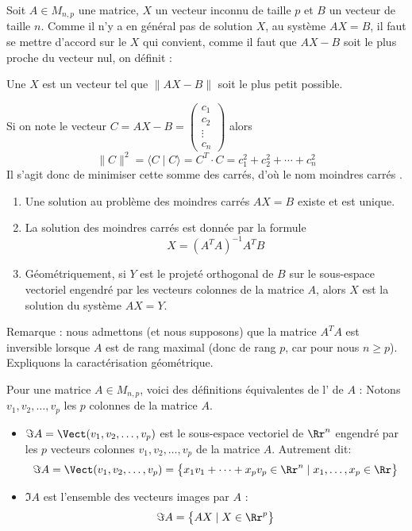 \documentclass[class=report,crop=false]{standalone}
\begin{document}
Soit $A \in M_{n,p}$ une matrice, $X$ un vecteur inconnu de taille $p$ et
$B$ un vecteur de taille $n$.
Comme il n'y a en général pas de solution $X$,
au système $AX=B$, il faut se mettre d'accord sur le $X$ qui 
convient, comme il faut que $AX-B$ soit le plus proche du vecteur nul,
on définit  :
\begin{definition}
Une  $X$ est un vecteur
tel que $\| AX -B \|$ soit le plus petit possible.
\end{definition}

Si on note le vecteur 
$C = AX-B = \left(\begin{smallmatrix}c_1\\c_2\\\vdots\\c_n\end{smallmatrix}\right)$ alors 
$$\| C \|^2 = \langle C \mid C \rangle = C^T \cdot C = c_1^2 + c_2^2+\cdots+c_n^2$$
Il s'agit donc de minimiser cette somme des carrés, d'où le nom \og moindres carrés \fg.

\begin{proposition}
\sauteligne
\begin{enumerate}
  \item Une solution au problème des moindres carrés $AX=B$ existe et est unique.
  \item La solution des moindres carrés est donnée par la formule 
  $$X = (A^TA)^{-1} A^T B$$ 
  \item Géométriquement, si $Y$ est le projeté orthogonal de $B$
  sur le sous-espace vectoriel engendré par les vecteurs colonnes de la matrice 
  $A$, alors $X$ est la solution du système $AX=Y$.
\end{enumerate} 
\end{proposition}


Remarque : nous admettons (et nous supposons) que la matrice $A^TA$ est inversible 
lorsque $A$ est de rang maximal (donc de rang $p$, car pour nous $n \ge p$).
Expliquons la caractérisation géométrique.


Pour une matrice $A \in M_{n,p}$, voici des définitions équivalentes de l' de $A$ :
Notons $v_1,v_2,\ldots,v_p$ les $p$ colonnes de la matrice $A$.

\begin{itemize}
  \item $\Im A = \Vect(v_1,v_2,\ldots,v_p)$ est le sous-espace vectoriel de $\Rr^n$ engendré par 
  les $p$ vecteurs colonnes $v_1,v_2,\ldots,v_p$ de la matrice $A$. Autrement dit:
  $$\Im A = \Vect(v_1,v_2,\ldots,v_p) = \big\lbrace x_1v_1+\cdots +x_pv_p \in\Rr^n\mid x_1,\ldots,x_p \in \Rr\big\rbrace$$
  
  \item $\Im A$ est l'ensemble des vecteurs images par $A$ :
  $$\Im A = \big\lbrace AX \mid X \in \Rr^p \big\rbrace$$
\end{itemize}
\end{document}
